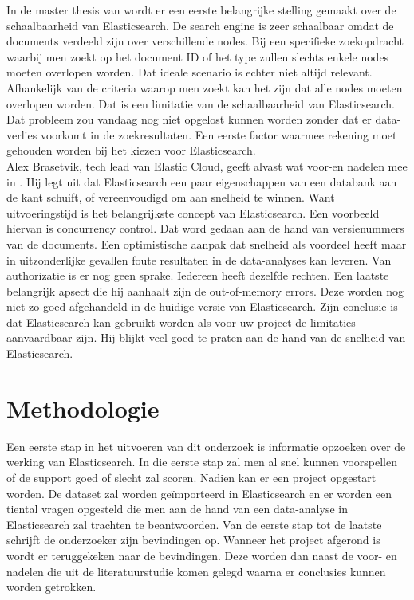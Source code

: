\documentclass[fleqn,10pt]{voorstel}
\begin{document}
	In de master thesis van \textcite{Berglund2013} wordt er een eerste belangrijke stelling gemaakt over de schaalbaarheid van Elasticsearch. De search engine is zeer schaalbaar omdat de documents verdeeld zijn over verschillende nodes. Bij een specifieke zoekopdracht waarbij men zoekt op het document ID of het type zullen slechts enkele nodes moeten overlopen worden. Dat ideale scenario is echter niet altijd relevant. Afhankelijk van de criteria waarop men zoekt kan het zijn dat alle nodes moeten overlopen worden. Dat is een limitatie van de schaalbaarheid van Elasticsearch. Dat probleem zou vandaag nog niet opgelost kunnen worden zonder dat er data-verlies voorkomt in de zoekresultaten. Een eerste factor waarmee rekening moet gehouden worden bij het kiezen voor Elasticsearch.
	\\
	Alex Brasetvik, tech lead van Elastic Cloud, geeft alvast wat voor-en nadelen mee in \textcite{Brasetvik2013}. Hij legt uit dat Elasticsearch een paar eigenschappen van een databank aan de kant schuift, of vereenvoudigd om aan snelheid te winnen. Want uitvoeringstijd is het belangrijkste concept van Elasticsearch. Een voorbeeld hiervan is concurrency control. Dat word gedaan aan de hand van versienummers van de documents. Een optimistische aanpak dat snelheid als voordeel heeft maar in uitzonderlijke gevallen foute resultaten in de data-analyses kan leveren. Van authorizatie is er nog geen sprake. Iedereen heeft dezelfde rechten. Een laatste belangrijk apsect die hij aanhaalt zijn de out-of-memory errors. Deze worden nog niet zo goed afgehandeld in de huidige versie van Elasticsearch.
	Zijn conclusie is dat Elasticsearch kan gebruikt worden als voor uw project de limitaties aanvaardbaar zijn. Hij blijkt veel goed te praten aan de hand van de snelheid van Elasticsearch.
	
	
	
	\section{Methodologie}
	\label{sec:methodologie}
	
	Een eerste stap in het uitvoeren van dit onderzoek is informatie opzoeken over de werking van Elasticsearch. In die eerste stap zal men al snel kunnen voorspellen of de support goed of slecht zal scoren. Nadien kan er een project opgestart worden. De dataset zal worden geïmporteerd in Elasticsearch en er worden een tiental vragen opgesteld die men aan de hand van een data-analyse in Elasticsearch zal trachten te beantwoorden. Van de eerste stap tot de laatste schrijft de onderzoeker zijn bevindingen op. Wanneer het project afgerond is wordt er teruggekeken naar de bevindingen. Deze worden dan naast de voor- en nadelen die uit de literatuurstudie komen gelegd waarna er conclusies kunnen worden getrokken.
		
\end{document}
